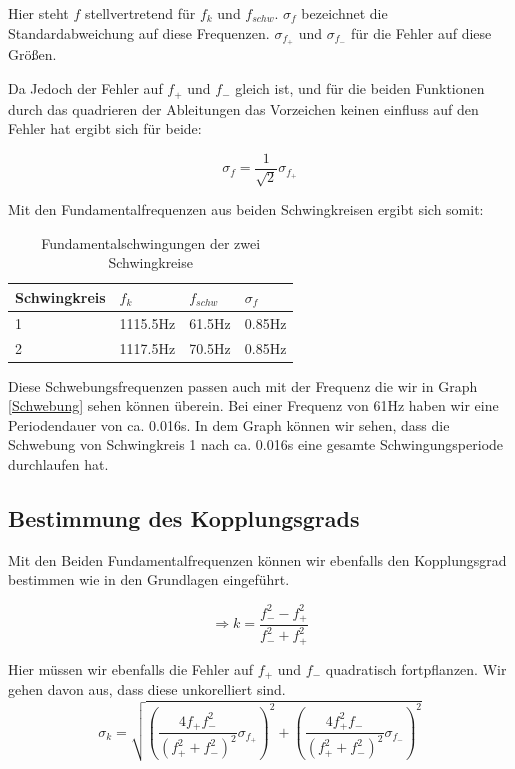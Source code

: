 \documentclass[twoside]{protokoll}
\begin{document}
Hier steht $f$ stellvertretend für $f_k$ und $f_{schw}$. $\sigma_f$ bezeichnet die Standardabweichung auf diese Frequenzen. 
$ \sigma_{f_+} $ und $ \sigma_{f_-}$ für die Fehler auf diese Größen.

Da Jedoch der Fehler auf $f_+$ und $f_-$ gleich ist, und für die beiden Funktionen durch das quadrieren der Ableitungen das Vorzeichen keinen einfluss auf den Fehler hat ergibt sich für beide:

\begin{equation}
\sigma_f = \frac{1}{\sqrt{2}}\sigma_{f_+}
\label{Fehler auf Schwebung}
\end{equation}

Mit den Fundamentalfrequenzen aus beiden Schwingkreisen ergibt sich somit:

\begin{table}[H]
    \centering
    \begin{tabularx}{1\textwidth}{X X X X} %
        \toprule
        \textbf{Schwingkreis} & \textbf{$f_k$} & \textbf{$f_{schw}$} & \textbf{$\sigma_f$} \\
        \midrule
        1 & 1115.5Hz & 61.5Hz & 0.85Hz\\
        2 & 1117.5Hz & 70.5Hz & 0.85Hz \\
        \bottomrule
    \end{tabularx}
    \caption{Fundamentalschwingungen der zwei Schwingkreise}
    \label{•}
\end{table} 

Diese Schwebungsfrequenzen passen auch mit der Frequenz die wir in Graph \ref{Schwebung} sehen können überein. 
Bei einer Frequenz von 61Hz haben wir eine Periodendauer von ca. 0.016s. 
In dem Graph können wir sehen, dass die Schwebung von Schwingkreis 1 nach ca. 0.016s eine gesamte Schwingungsperiode durchlaufen hat.

\subsection{Bestimmung des Kopplungsgrads}

Mit den Beiden Fundamentalfrequenzen können wir ebenfalls den Kopplungsgrad bestimmen wie in den Grundlagen eingeführt.

\begin{equation}
    \Rightarrow k = \frac{f_-^2 - f_+^2}{f_-^2 + f_+^2}
    \label{Kopplungsgrad}
\end{equation}

Hier müssen wir ebenfalls die Fehler auf $f_+$ und $f_-$ quadratisch fortpflanzen. Wir gehen davon aus, dass diese unkorelliert sind.
\begin{equation}
    \sigma_k =\sqrt{\left(\frac{4f_+f_-^2}{\left(f_+^2+f_-^2\right)^2}\sigma_{f_+}\right)^2 + \left(\frac{4f_+^2f_-}{\left(f_+^2+f_-^2\right)^2}\sigma_{f_-}\right)^2}
    \label{Fehlerfortpflanzung_kopplung}
\end{equation}
\end{document}
